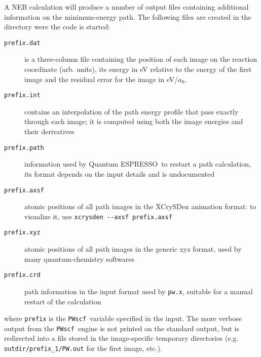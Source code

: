 \documentclass[12pt,a4paper]{article}
\def\qe{{\sc Quantum ESPRESSO}}
\def\pwx{\texttt{pw.x}}
\def\PWscf{\texttt{PWscf}}
\begin{document}
A NEB calculation will produce a number of output files containing additional 
information on the minimum-energy path. The following files are created in the
directory were the code is started:
\begin{description}
\item[\texttt{prefix.dat}]
is a three-column file containing the position of each image on the reaction
coordinate (arb. units), its energy in eV relative to the energy of the first image
and the residual error for the image in eV/$a_0$.
\item[\texttt{prefix.int}]
contains an interpolation of the path energy profile that pass exactly through each
image; it is computed using both the image energies and their derivatives
\item[\texttt{prefix.path}]
information used by \qe\ 
to restart a path calculation, its format depends on the input
details and is undocumented
\item[\texttt{prefix.axsf}]
atomic positions of all path images in the XCrySDen animation format:
to visualize it, use \texttt{xcrysden -\--axsf prefix.axsf}
\item[\texttt{prefix.xyz}]
atomic positions of all path images in the generic xyz format, used by
many quantum-chemistry softwares
\item[\texttt{prefix.crd}]
path information in the input format used by \pwx, suitable for a manual
restart of the calculation
\end{description}
where \texttt{prefix} is the \PWscf\ variable specified in the input.
The more verbose output from the \PWscf\ engine is not printed on the standard
output, but is redirected into a file stored in the image-specific temporary 
directories (e.g. \texttt{outdir/prefix\_1/PW.out} for the first image, etc.).
\end{document}
